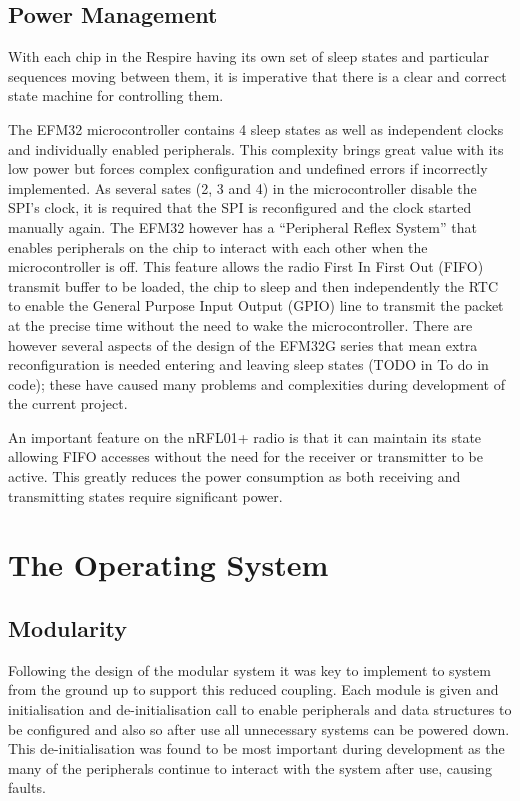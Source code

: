\subsection{Power Management}
With each chip in the Respire having its own set of sleep states and particular sequences moving
between them, it is imperative that there is a clear and correct state machine for controlling them.


The EFM32 microcontroller contains 4 sleep states as well as independent clocks and individually
enabled peripherals. This complexity brings great value with its low power but forces complex
configuration and undefined errors if incorrectly implemented. As several sates (2, 3 and 4) in the
microcontroller disable the SPI’s clock, it is required that the SPI is reconfigured and the clock started
manually again. The EFM32 however has a “Peripheral Reflex System” that enables peripherals on
the chip to interact with each other when the microcontroller is off. This feature allows the radio
First In First Out (FIFO) transmit buffer to be loaded, the chip to sleep and then independently the
RTC to enable the General Purpose Input Output (GPIO) line to transmit the packet at the precise
time without the need to wake the microcontroller. There are however several aspects of the design
of the EFM32G series\cite{Energy Micro AS, 2012} that mean extra reconfiguration is needed entering
and leaving sleep states (TODO in To do in code); these have caused many problems and
complexities during development of the current project.


An important feature on the nRFL01+ radio is that it can maintain its state allowing FIFO accesses
without the need for the receiver or transmitter to be active. This greatly reduces the power
consumption as both receiving and transmitting states require significant power.


\section{The Operating System}

\subsection{Modularity}
Following the design of the modular system it was key to implement to system from the ground up
to support this reduced coupling. Each module is given and initialisation and de-initialisation call to
enable peripherals and data structures to be configured and also so after use all unnecessary
systems can be powered down. This de-initialisation was found to be most important during
development as the many of the peripherals continue to interact with the system after use, causing
faults.


